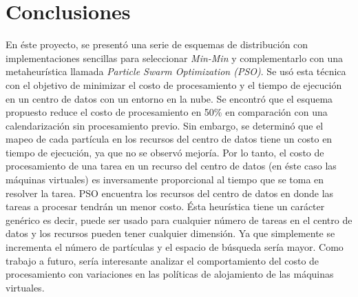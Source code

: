 \chead{}
\rhead{\thepage}

\chapter*{Conclusiones}

En éste proyecto, se presentó una serie de esquemas de distribución con implementaciones sencillas para seleccionar \textit{Min-Min} y complementarlo con una metaheurística  llamada \textit{Particle Swarm Optimization (PSO)}. Se usó esta técnica con el objetivo de minimizar el costo de procesamiento y el tiempo de ejecución en un centro de datos con un entorno en la nube. Se encontró que el esquema propuesto reduce el costo de procesamiento en 50\% en comparación con una calendarización sin procesamiento previo. Sin embargo, se determinó que el mapeo de cada partícula en los recursos del centro de datos tiene un costo en tiempo de ejecución, ya que no se observó mejoría. Por lo tanto, el costo de procesamiento de una tarea en un recurso del centro de datos (en éste caso las máquinas virtuales) es inversamente proporcional al tiempo que se toma en resolver la tarea.
PSO encuentra los recursos del centro de datos en donde las tareas a procesar tendrán un menor costo. Ésta heurística tiene un carácter genérico es decir, puede ser usado para cualquier número de tareas en el centro de datos y los recursos pueden tener cualquier dimensión. Ya que simplemente se incrementa el número de partículas y el espacio de búsqueda sería mayor.
Como trabajo a futuro, sería interesante analizar el comportamiento del costo de procesamiento con variaciones en las políticas de alojamiento de las máquinas virtuales.



